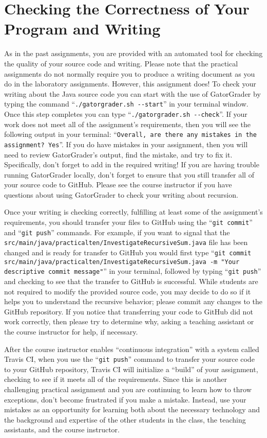 \documentclass[11pt]{article}
\newcommand{\mainprogramsource}{\lstinline{src/main/java/practicalten/InvestigateRecursiveSum.java}}
\newcommand{\gatorgraderstart}{\command{./gatorgrader.sh --start}}
\newcommand{\gatorgradercheck}{\command{./gatorgrader.sh --check}}
\newcommand{\gitcommit}{\command{git commit}}
\newcommand{\gitpush}{\command{git push}}
\newcommand{\gitcommitmainprogram}{\command{git commit src/main/java/practicalten/InvestigateRecursiveSum.java -m "Your
descriptive commit message"}}
\newcommand{\command}[1]{``\lstinline{#1}''}
\newcommand{\step}[1]{``{#1}''}
\begin{document}
\section*{Checking the Correctness of Your Program and Writing}

As in the past assignments, you are provided with an automated tool for checking
the quality of your source code and writing. Please note that the practical
assignments do not normally require you to produce a writing document as you do
in the laboratory assignments. However, this assignment does! To check your
writing about the Java source code you can start with the use of GatorGrader
by typing the command \gatorgraderstart{} in your terminal window. Once this step
completes you can type \gatorgradercheck{}. If your work does not meet all of
the assignment's requirements, then you will see the following output in your
terminal: \command{Overall, are there any mistakes in the assignment? Yes}. If
you do have mistakes in your assignment, then you will need to review
GatorGrader's output, find the mistake, and try to fix it. Specifically, don't
forget to add in the required writing! If you are having trouble running
GatorGrader locally, don't forget to ensure that you still transfer all of your
source code to GitHub. Please see the course instructor if you have questions
about using GatorGrader to check your writing about recursion.

Once your writing is checking correctly, fulfilling at least some of the
assignment's requirements, you should transfer your files to GitHub using the
\gitcommit{} and \gitpush{} commands. For example, if you want to signal that
the \mainprogramsource{} file has been changed and is ready for transfer to
GitHub you would first type \gitcommitmainprogram{} in your terminal, followed
by typing \gitpush{} and checking to see that the transfer to GitHub is
successful. While students are not required to modify the provided source code,
you may decide to do so if it helps you to understand the recursive behavior;
please commit any changes to the GitHub repository. If you notice that
transferring your code to GitHub did not work correctly, then please try to
determine why, asking a teaching assistant or the course instructor for help, if
necessary.

After the course instructor enables \step{continuous integration} with a system called Travis CI, when you use the
\gitpush{} command to transfer your source code to your GitHub repository, Travis CI will initialize a \step{build} of
your assignment, checking to see if it meets all of the requirements. Since this is another challenging practical
assignment and you are continuing to learn how to throw exceptions, don't become frustrated if you make a mistake.
Instead, use your mistakes as an opportunity for learning both about the necessary technology and the background and
expertise of the other students in the class, the teaching assistants, and the course instructor.
\end{document}

